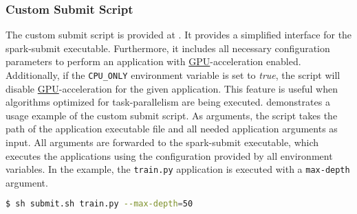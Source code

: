 \subsubsection{Custom Submit Script}
The custom submit script is provided at . It provides a simplified interface for the spark-submit executable. Furthermore, it includes all necessary configuration parameters to perform an application with \hyperlink{abbr:gpu}{GPU}-acceleration enabled. Additionally, if the \texttt{CPU\_ONLY} environment variable is set to \textit{true}, the script will disable \hyperlink{abbr:gpu}{GPU}-acceleration for the given application.
This feature is useful when algorithms optimized for task-parallelism are being executed.
 demonstrates a usage example of the custom submit script.
As arguments, the script takes the path of the application executable file and all needed application arguments as input. All arguments are forwarded to the spark-submit executable, which executes the applications using the configuration provided by all environment variables. In the example, the \texttt{train.py} application is executed with a \texttt{max-depth} argument. 
\begin{lstlisting}[label=lst:06_env_depl_submit, caption=Usage of the submit script, language=bash, numbers=none]
$ sh submit.sh train.py --max-depth=50
\end{lstlisting}


